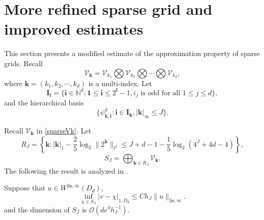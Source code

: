 \section{More refined sparse grid and improved estimates}
This section presents a modified estimate \cite{bungartz2004sparse} of the approximation property of sparse grids. Recall 
$$
\mathcal V_{\mathbf{k}} = \mathcal V_{k_1} \bigotimes  \mathcal V_{k_2}\bigotimes\cdots \bigotimes  \mathcal V_{k_d},
$$
where $\mathbf{k}=(k_1,k_2,\cdots,k_d)$ is a multi-index. Let 
$$
\mathbf{I_l}=\{\mathbf{i}\in \mathbb{N}^d: \mathbf{1}\le \mathbf{i}\le 2^\mathbf{l}-1, i_j \text{ is odd for all }1\le j\le d\},
$$
and the hierarchical basis 
$$
\{\psi_\mathbf{k, i}^d: \mathbf{i}\in \mathbf{I_k}, |\mathbf{k}|_\infty\le J\}.
$$ 




Recall $\mathcal V_{\mathbf{k}}$ in \eqref{sparseVk}. Let
$$
R_J=\left\{\mathbf{k}: |\mathbf{k}|_1 - \frac25 \log_2\|2^{\mathbf{k}}\|_{l^2}\le J+d-1- \frac15 \log_2 (4^J +4d-4)\right\},
$$
\begin{equation}
  \label{sparseVJ}
S_J =\bigoplus_{\mathbf{k}\in R_J} \mathcal V_{\mathbf{k}}.  
\end{equation}
The following the result is analyzed in \cite{bungartz2004sparse}.
 \begin{theorem}
Suppose that  $u\in W^{2\mathbf{e}, \infty}(D_d)$,
$$
\inf_{\chi\in S_J} |v-\chi|_{1, D_d}\le C h_J \|u\|_{2\mathbf{e},\infty}.
$$
and the dimension of $S_J$ is $\mathcal{O}(de^dh_J^{-1})$.
\end{theorem}
